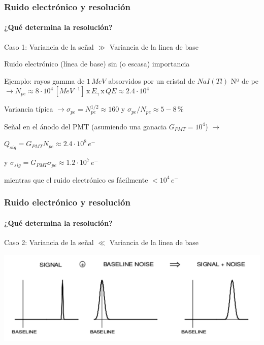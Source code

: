 \documentclass{beamer}
\begin{document}
\begin{frame}
\frametitle{Ruido electrónico y resolución}
\framesubtitle{¿Qué determina la resolución?}
{\color{blue}Caso 1: Variancia de la señal $\gg$ Variancia de la linea de base} 
\begin{alertblock}{}
Ruido electrónico (línea de base) sin (o escasa) importancia
\end{alertblock}
\begin{block}{Ejemplo: \footnotesize{rayos gamma de $1\,MeV$ absorvidos por un cristal de $NaI(Tl)$}}
Nº de pe $\rightarrow N_{pe} \approx
8\cdot10^4\,[MeV^{-1}]\,\text{x}\,E_{\gamma}\,\text{x}\,QE \approx 2.4\cdot10^4$

\vspace{1mm}
Variancia típica $\rightarrow \sigma_{pe} = N_{pe}^{1/2} \approx 160$ y
$\sigma_{pe}/N_{pe} \approx 5 - 8\,\%$ 

\vspace{1mm}
Señal en el ánodo del PMT (asumiendo una ganacia $G_{PMT} = 10^4$) $\rightarrow$  
\begin{center}
$Q_{sig} = G_{PMT}N_{pe} \approx 2.4\cdot10^8\,e^-$  

\vspace{1mm}
y $\sigma_{sig} = G_{PMT}\sigma_{pe}
\approx 1.2\cdot10^7\,e^-$ 
\end{center}

\alert{mientras que el ruido electrónico es fácilmente $< 10^4\, e^-$}
\end{block}
\end{frame} 

\begin{frame}
\frametitle{Ruido electrónico y resolución}
\framesubtitle{¿Qué determina la resolución?}
{\color{blue}Caso 2: Variancia de la señal $\ll$ Variancia de la linea de base} 
\begin{center}
\includegraphics[height=0.5\textheight,width=\textwidth]{d1/baseline_mayor_signal} 
\end{center}
\end{frame} 
\end{document}
